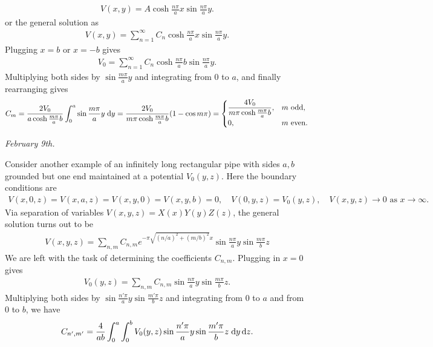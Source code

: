 \begin{align}
    V(x,y) = A \cosh \frac{n \pi}{a} x \sin \frac{n \pi}{a} y.
\end{align}
or the general solution as
\begin{align}
    V(x,y) = \sum_{n=1}^{\infty} C_{n} \cosh \frac{n \pi}{a} x \sin \frac{n \pi}{a} y.
\end{align}Plugging $x = b$ or $x = -b$ gives
\begin{align}
    V_{0} = \sum_{n=1}^{\infty} C_{n} \cosh \frac{n \pi}{a} b \sin \frac{n \pi}{a} y.
\end{align}
Multiplying both sides by $\sin \frac{m \pi}{a} y$ and integrating from $0$ to $a$, and finally rearranging gives
\begin{align}
    C_{m} = \frac{2 V_{0}}{a \cosh \frac{m \pi}{a} b} \int_{0}^{a} \sin \frac{m \pi}{a} y \; \mathrm{d}y = \frac{2 V_{0}}{m \pi \cosh \frac{m \pi}{a} b} (1 - \cos m \pi) = \begin{cases}
        \dfrac{4 V_{0}}{m \pi \cosh \frac{m \pi}{a} b}, & m \text{ odd}, \\
        0, & m \text{ even}.
\end{cases}
\end{align}


\noindent \textit{February 9th.}

Consider another example of an infinitely long rectangular pipe with sides $a,b$ grounded but one end maintained at a potential $V_{0}(y,z)$. Here the boundary conditions are 
\begin{align}
    V(x,0,z) = V(x,a,z) = V(x,y,0) = V(x,y,b) = 0, \quad V(0,y,z) = V_{0}(y,z), \quad V(x,y,z) \to 0 \text{ as } x \to \infty.
\end{align}
Via separation of variables $V(x,y,z) = X(x) Y(y) Z(z)$, the general solution turns out to be
\begin{align}
    V(x,y,z) = \sum_{n,m} C_{n,m} e^{-\pi\sqrt{(n/a)^{2}+(m/b)^{2}} x} \sin \frac{n \pi}{a} y \sin \frac{m \pi}{b} z
\end{align}
We are left with the task of determining the coefficients $C_{n,m}$. Plugging in $x = 0$ gives
\begin{align}
    V_{0}(y,z) = \sum_{n,m} C_{n,m} \sin \frac{n \pi}{a} y \sin \frac{m \pi}{b} z.
\end{align}
Multiplying both sides by $\sin \frac{n' \pi}{a} y \sin \frac{m' \pi}{b} z$ and integrating from $0$ to $a$ and from $0$ to $b$, we have
\begin{align}
    C_{n',m'} = \frac{4}{ab} \int_{0}^{a} \int_{0}^{b} V_{0}(y,z) \sin \frac{n' \pi}{a} y \sin \frac{m' \pi}{b} z \; \mathrm{d}y \, \mathrm{d}z.
\end{align}


